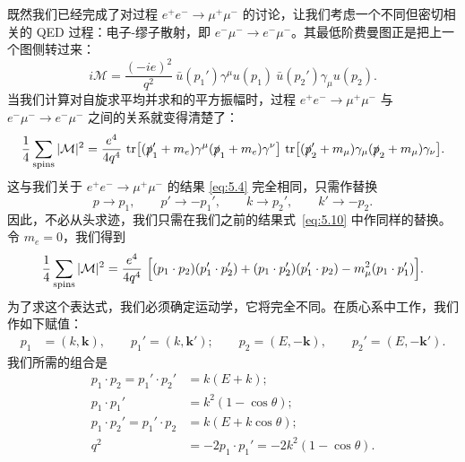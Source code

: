 既然我们已经完成了对过程 $e^{+}e^{-}\to\mu^{+}\mu^{-}$ 的讨论，让我们考虑一个不同但密切相关的 QED 过程：电子-缪子散射，即 $e^{-}\mu^{-}\to e^{-}\mu^{-}$。其最低阶费曼图正是把上一个图侧转过来：
\begin{equation}
  i\mathcal{M} = \frac{(-ie)^2}{q^2}\ \bar{u}(p_1')\gamma^\mu u(p_1)\
    \bar{u}(p_2')\gamma_\mu u(p_2) .
\end{equation}
当我们计算对自旋求平均并求和的平方振幅时，过程 $e^{+}e^{-}\to\mu^{+}\mu^{-}$ 与 $e^{-}\mu^{-}\to e^{-}\mu^{-}$ 之间的关系就变得清楚了：
\begin{equation}
  \frac{1}{4}\sum_{\text{spins}}|\mathcal{M}|^2
    = \frac{e^4}{4q^4}\ \mathrm{tr}\bigl[
      (\slashed{p}_1' + m_e)\gamma^\mu(\slashed{p}_1 + m_e)\gamma^\nu \bigr]\
      \mathrm{tr}\bigl[ (\slashed{p}_2' + m_\mu)\gamma_\mu(\slashed{p}_2
        + m_\mu)\gamma_\nu \bigr] .
\end{equation}
这与我们关于 $e^{+}e^{-}\to\mu^{+}\mu^{-}$ 的结果 \eqref{eq:5.4} 完全相同，只需作替换
\begin{equation}
  p \to p_1,\qquad p' \to -p_1',\qquad k \to p_2',\qquad k' \to -p_2 .
  \label{eq:5.60}
\end{equation}
因此，不必从头求迹，我们只需在我们之前的结果式~\eqref{eq:5.10} 中作同样的替换。令 $m_e = 0$，我们得到
\begin{equation}
  \frac{1}{4}\sum_{\text{spins}}|\mathcal{M}|^2
    = \frac{e^4}{4q^4}\ \Bigl[ (p_1\cdot p_2)(p_1'\cdot p_2')
      + (p_1\cdot p_2')(p_1'\cdot p_2) - m_\mu^2(p_1\cdot p_1') \Bigr] .
  \label{eq:5.61}
\end{equation}
为了求这个表达式，我们必须确定运动学，它将完全不同。在质心系中工作，我们作如下赋值：
\begin{equation}
  \begin{aligned}
    p_1 &= (k, \mathbf{k}),\qquad p_1' = (k, \mathbf{k}');\qquad
    p_2 = (E, -\mathbf{k}),\qquad p_2' = (E, -\mathbf{k}').
  \end{aligned}
\end{equation}
我们所需的组合是
\begin{equation}
  \begin{aligned}
    p_1\cdot p_2 = p_1'\cdot p_2' &= k(E+k);\\
    p_1\cdot p_1' &= k^2(1-\cos\theta);\\
    p_1\cdot p_2' = p_1'\cdot p_2 &= k(E+k\cos\theta);\\
    q^2 &= -2p_1\cdot p_1' = -2k^2(1-\cos\theta) .
  \end{aligned}
\end{equation}
